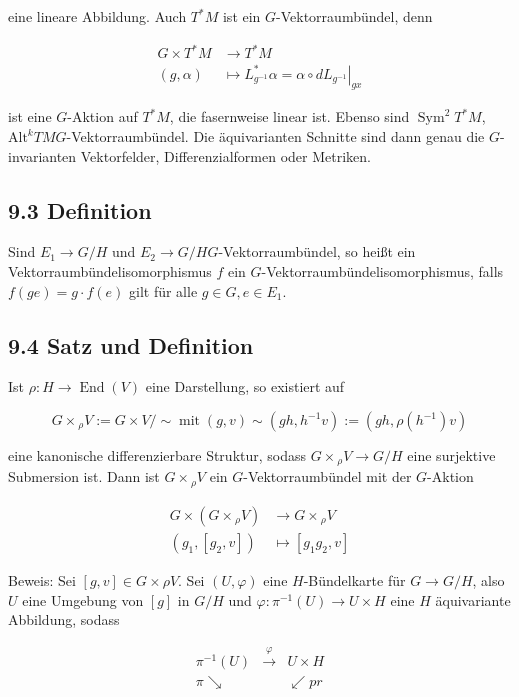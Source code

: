 \documentclass[10pt, letterpaper]{article}
\begin{document}
eine lineare Abbildung. Auch $T^{*} M$ ist ein $G$-Vektorraumbündel, denn

$$
\begin{aligned}
G \times T^{*} M & \rightarrow T^{*} M \\
(g, \alpha) & \mapsto L_{g^{-1}}^{*} \alpha=\left.\alpha \circ d L_{g^{-1}}\right|_{g x}
\end{aligned}
$$

ist eine $G$-Aktion auf $T^{*} M$, die fasernweise linear ist. Ebenso sind $\operatorname{Sym}^{2} T^{*} M$, $\mathrm{Alt}^{k} T M G$-Vektorraumbündel. Die äquivarianten Schnitte sind dann genau die $G$-invarianten Vektorfelder, Differenzialformen oder Metriken.

\subsection*{9.3 Definition}
Sind $E_{1} \rightarrow G / H$ und $E_{2} \rightarrow G / H G$-Vektorraumbündel, so heißt ein Vektorraumbündelisomorphismus $f$ ein $G$-Vektorraumbündelisomorphismus, falls $f(g e)=g \cdot f(e)$ gilt für alle $g \in G, e \in E_{1}$.

\subsection*{9.4 Satz und Definition}
Ist $\rho: H \rightarrow \operatorname{End}(V)$ eine Darstellung, so existiert auf

$$
G \times{ }_{\rho} V:=G \times V / \sim \operatorname{mit}(g, v) \sim\left(g h, h^{-1} v\right):=\left(g h, \rho\left(h^{-1}\right) v\right)
$$

eine kanonische differenzierbare Struktur, sodass $G \times{ }_{\rho} V \rightarrow G / H$ eine surjektive Submersion ist. Dann ist $G \times{ }_{\rho} V$ ein $G$-Vektorraumbündel mit der $G$-Aktion

$$
\begin{aligned}
G \times\left(G \times{ }_{\rho} V\right) & \rightarrow G \times{ }_{\rho} V \\
\left(g_{1},\left[g_{2}, v\right]\right) & \mapsto\left[g_{1} g_{2}, v\right]
\end{aligned}
$$

Beweis: Sei $[g, v] \in G \times \rho V$. Sei $(U, \varphi)$ eine $H$-Bündelkarte für $G \rightarrow G / H$, also $U$ eine Umgebung von $[g]$ in $G / H$ und $\varphi: \pi^{-1}(U) \rightarrow U \times H$ eine $H$ äquivariante Abbildung, sodass

$$
\begin{array}{ccc}
\pi^{-1}(U) & \xrightarrow{\varphi} & U \times H \\
\pi \searrow & & \swarrow p r
\end{array}
$$
\end{document}

